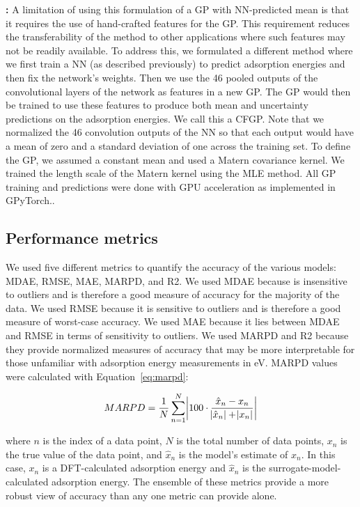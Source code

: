 \documentclass[]{achemso}
\begin{document}
\textbf{:}
A limitation of using this formulation of a \gls{GP} with \gls{NN}-predicted mean is that it requires the use of hand-crafted features for the \gls{GP}.
This requirement reduces the transferability of the method to other applications where such features may not be readily available.
To address this, we formulated a different method where we first train a \gls{NN} (as described previously) to predict adsorption energies and then fix the network's weights.
Then we use the 46 pooled outputs of the convolutional layers of the network as features in a new \gls{GP}.
The \gls{GP} would then be trained to use these features to produce both mean and uncertainty predictions on the adsorption energies.
We call this a \gls{CFGP}.
Note that we normalized the 46 convolution outputs of the \gls{NN} so that each output would have a mean of zero and a standard deviation of one across the training set.
To define the \gls{GP}, we assumed a constant mean and used a Matern covariance kernel.
We trained the length scale of the Matern kernel using the \gls{MLE} method.
All \gls{GP} training and predictions were done with GPU acceleration as implemented in GPyTorch.\cite{Gardner2018}.


\subsection{Performance metrics}

We used five different metrics to quantify the accuracy of the various models:  \gls{MDAE}, \gls{RMSE}, \gls{MAE}, \gls{MARPD}, and \gls{R2}.
We used \gls{MDAE} because is insensitive to outliers and is therefore a good measure of accuracy for the majority of the data.
We used \gls{RMSE} because it is sensitive to outliers and is therefore a good measure of worst-case accuracy.
We used \gls{MAE} because it lies between \gls{MDAE} and \gls{RMSE} in terms of sensitivity to outliers.
We used \gls{MARPD} and \gls{R2} because they provide normalized measures of accuracy that may be more interpretable for those unfamiliar with adsorption energy measurements in \gls{eV}.
\gls{MARPD} values were calculated with Equation~\ref{eq:marpd}: 

\begin{equation}\label{eq:marpd}
    MARPD = \frac{1}{N} \sum_{n=1}^{N} \abs{100 \cdot \frac{\hat{x}_n - x_n}{\abs{\hat{x}_n} + \abs{x_n}}}
\end{equation}

\noindent where $n$ is the index of a data point, $N$ is the total number of data points, $x_n$ is the true value of the data point, and $\hat{x}_n$ is the model's estimate of $x_n$.
In this case, $x_n$ is a DFT-calculated adsorption energy and $\hat{x}_n$ is the surrogate-model-calculated adsorption energy.
The ensemble of these metrics provide a more robust view of accuracy than any one metric can provide alone.
\end{document}
